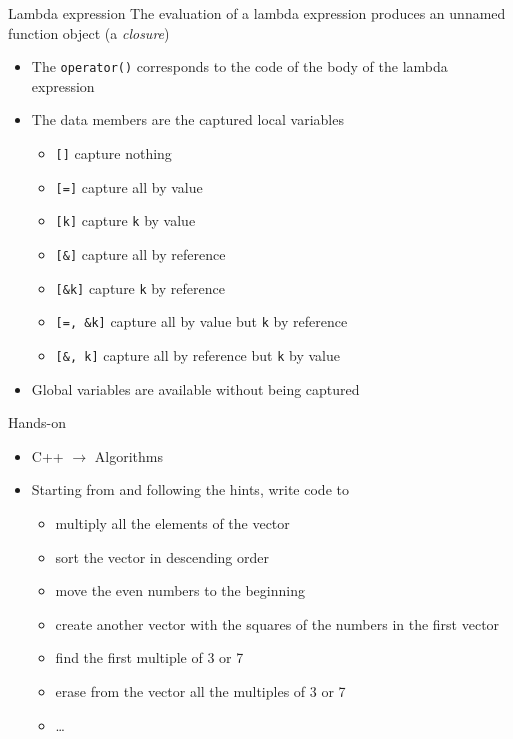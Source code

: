 \begin{frame}[fragile]{Lambda expression \insertcontinuationtext}
  The evaluation of a lambda expression produces an unnamed function object (a
  \textit{closure})
  \begin{itemize}
  \item The \texttt{operator()} corresponds to the code of the body of the
    lambda expression
  \item The data members are the captured local variables

    \begin{itemize}
    \item \texttt{[]} capture nothing
    \item \texttt{[=]} capture all by value
    \item \texttt{[k]} capture \texttt{k} by value
    \item \texttt{[\&]} capture all by reference
    \item \texttt{[\&k]} capture \texttt{k} by reference
    \item \texttt{[=, \&k]} capture all by value but \texttt{k} by reference
    \item \texttt{[\&, k]} capture all by reference but \texttt{k} by value
    \end{itemize}

  \item Global variables are available without being captured
  \end{itemize}
\end{frame}

\begin{frame}{Hands-on}
  \begin{itemize}
  \item C++ $\rightarrow$ Algorithms
  \item Starting from  and following the hints, write
    code to
    \begin{itemize}
    \item multiply all the elements of the vector
    \item sort the vector in descending order
    \item move the even numbers to the beginning
    \item create another vector with the squares of the numbers in the first vector
    \item find the first multiple of 3 or 7
    \item erase from the vector all the multiples of 3 or 7
    \item \ldots
    \end{itemize}
  \end{itemize}
\end{frame}


